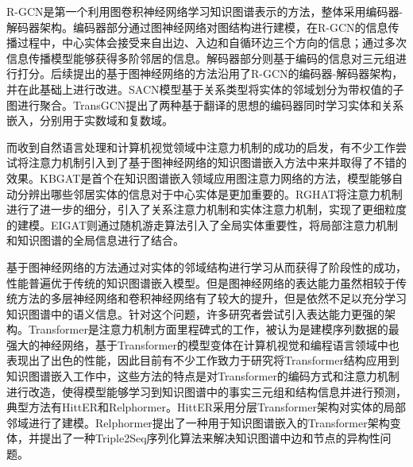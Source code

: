 R-GCN是第一个利用图卷积神经网络学习知识图谱表示的方法，整体采用编码器-解码器架构。编码器部分通过图神经网络对图结构进行建模，在R-GCN的信息传播过程中，中心实体会接受来自出边、入边和自循环边三个方向的信息；通过多次信息传播模型能够获得多阶邻居的信息。解码器部分则基于编码的信息对三元组进行打分。后续提出的基于图神经网络的方法沿用了R-GCN的编码器-解码器架构，并在此基础上进行改进。SACN模型基于关系类型将实体的邻域划分为带权值的子图进行聚合。TransGCN提出了两种基于翻译的思想的编码器同时学习实体和关系嵌入，分别用于实数域和复数域。

而收到自然语言处理和计算机视觉领域中注意力机制的成功的启发，有不少工作尝试将注意力机制引入到了基于图神经网络的知识图谱嵌入方法中来并取得了不错的效果。KBGAT是首个在知识图谱嵌入领域应用图注意力网络的方法，模型能够自动分辨出哪些邻居实体的信息对于中心实体是更加重要的。RGHAT将注意力机制进行了进一步的细分，引入了关系注意力机制和实体注意力机制，实现了更细粒度的建模。EIGAT则通过随机游走算法引入了全局实体重要性，将局部注意力机制和知识图谱的全局信息进行了结合。

基于图神经网络的方法通过对实体的邻域结构进行学习从而获得了阶段性的成功，性能普遍优于传统的知识图谱嵌入模型。但是图神经网络的表达能力虽然相较于传统方法的多层神经网络和卷积神经网络有了较大的提升，但是依然不足以充分学习知识图谱中的语义信息。针对这个问题，许多研究者尝试引入表达能力更强的架构。Transformer是注意力机制方面里程碑式的工作，被认为是建模序列数据的最强大的神经网络，基于Transformer的模型变体在计算机视觉和编程语言领域中也表现出了出色的性能，因此目前有不少工作致力于研究将Transformer结构应用到知识图谱嵌入工作中，这些方法的特点是对Transformer的编码方式和注意力机制进行改造，使得模型能够学习到知识图谱中的事实三元组和结构信息并进行预测，典型方法有HittER和Relphormer。HittER采用分层Transformer架构对实体的局部邻域进行了建模。Relphormer提出了一种用于知识图谱嵌入的Transformer架构变体，并提出了一种Triple2Seq序列化算法来解决知识图谱中边和节点的异构性问题。

